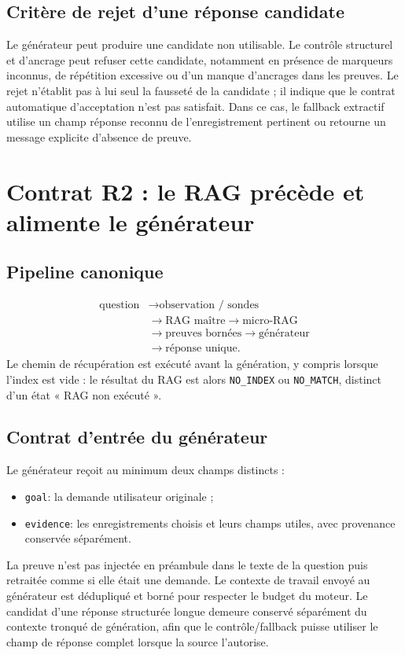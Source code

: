 \documentclass[11pt,a4paper]{article}
\begin{document}
\subsection{Critère de rejet d'une réponse candidate}
Le générateur peut produire une candidate non utilisable. Le contrôle structurel et d'ancrage peut refuser cette candidate, notamment en présence de marqueurs inconnus, de répétition excessive ou d'un manque d'ancrages dans les preuves. Le rejet n'établit pas à lui seul la fausseté de la candidate ; il indique que le contrat automatique d'acceptation n'est pas satisfait. Dans ce cas, le fallback extractif utilise un champ réponse reconnu de l'enregistrement pertinent ou retourne un message explicite d'absence de preuve.

\section{Contrat R2 : le RAG précède et alimente le générateur}
\subsection{Pipeline canonique}
\[
\begin{aligned}
\text{question} &\rightarrow \text{observation / sondes}\\
&\rightarrow \text{RAG maître} \rightarrow \text{micro-RAG}\\
&\rightarrow \text{preuves bornées} \rightarrow \text{générateur}\\
&\rightarrow \text{réponse unique}.
\end{aligned}
\]
Le chemin de récupération est exécuté avant la génération, y compris lorsque l'index est vide : le résultat du RAG est alors \texttt{NO\_INDEX} ou \texttt{NO\_MATCH}, distinct d'un état « RAG non exécuté ».

\subsection{Contrat d'entrée du générateur}
Le générateur reçoit au minimum deux champs distincts :
\begin{itemize}
\item \texttt{goal}: la demande utilisateur originale ;
\item \texttt{evidence}: les enregistrements choisis et leurs champs utiles, avec provenance conservée séparément.
\end{itemize}
La preuve n'est pas injectée en préambule dans le texte de la question puis retraitée comme si elle était une demande. Le contexte de travail envoyé au générateur est dédupliqué et borné pour respecter le budget du moteur. Le candidat d'une réponse structurée longue demeure conservé séparément du contexte tronqué de génération, afin que le contrôle/fallback puisse utiliser le champ de réponse complet lorsque la source l'autorise.
\end{document}
